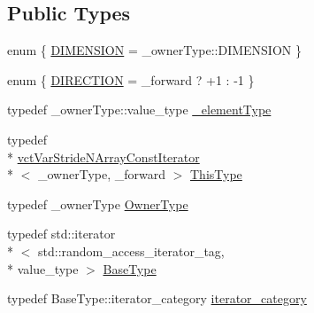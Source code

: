 \subsection*{Public Types}
\begin{DoxyCompactItemize}
\item 
enum \{ \hyperlink{classvct_var_stride_n_array_const_iterator_af8a3a7bff8c62645957f37e5f0a2cb26a66232514960f77bde765de7883b9c9ad}{D\-I\-M\-E\-N\-S\-I\-O\-N} = \-\_\-owner\-Type\-:\-:D\-I\-M\-E\-N\-S\-I\-O\-N
 \}
\item 
enum \{ \hyperlink{classvct_var_stride_n_array_const_iterator_af0ff516839367c7e5b697e375001ec43a12bc9e225c77c3bac1de598aa549843b}{D\-I\-R\-E\-C\-T\-I\-O\-N} = \-\_\-forward ? +1 \-: -\/1
 \}
\item 
typedef \-\_\-owner\-Type\-::value\-\_\-type \hyperlink{classvct_var_stride_n_array_const_iterator_adb02654cc147e6ce3ceef03ebe78c4e2}{\-\_\-element\-Type}
\item 
typedef \\*
\hyperlink{classvct_var_stride_n_array_const_iterator}{vct\-Var\-Stride\-N\-Array\-Const\-Iterator}\\*
$<$ \-\_\-owner\-Type, \-\_\-forward $>$ \hyperlink{classvct_var_stride_n_array_const_iterator_ac729d2af265785aad6fdd43a70fbffdb}{This\-Type}
\item 
typedef \-\_\-owner\-Type \hyperlink{classvct_var_stride_n_array_const_iterator_ac75d53a8defeee467ba9ebe2962e29ac}{Owner\-Type}
\item 
typedef std\-::iterator\\*
$<$ std\-::random\-\_\-access\-\_\-iterator\-\_\-tag, \\*
value\-\_\-type $>$ \hyperlink{classvct_var_stride_n_array_const_iterator_a7aa82e6a4135b2dca6679c1253c9aa34}{Base\-Type}
\item 
typedef Base\-Type\-::iterator\-\_\-category \hyperlink{classvct_var_stride_n_array_const_iterator_a09142c21a89b54a40ad29eb7972c6f78}{iterator\-\_\-category}
\end{DoxyCompactItemize}

